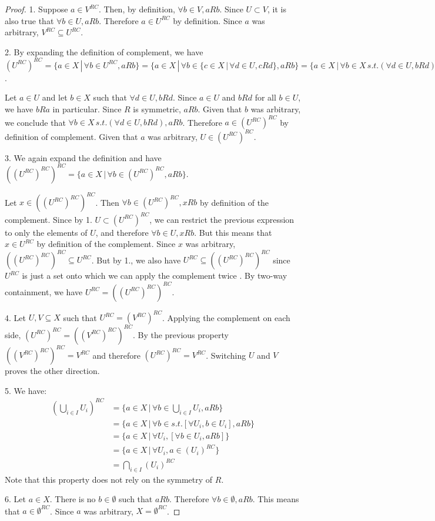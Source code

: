 \begin{proof}
	1. Suppose $a \in V^{RC}$. Then, by definition, $\forall b \in V, aRb$. Since $U \subset V$, it is also true that $\forall b \in U, aRb$. Therefore $a \in U^{RC}$ by definition. Since $a$ was arbitrary, $V^{RC} \subseteq U^{RC}$.
	
	2. By expanding the definition of complement, we have $(U^{RC})^{RC}=\{ a \in X \, | \, \forall b \in U^{RC}, aRb \} = \{ a \in X \, | \, \forall b \in \{ c \in X \, | \, \forall d \in U, cRd  \}, aRb \} = \{ a \in X \, | \, \forall b \in X \, s.t. (\forall d \in U, bRd), aRb \}$.
	
	Let $a \in U$ and let $b \in X$ such that $\forall d \in U, bRd$. Since $a \in U$ and $bRd$ for all $b \in U$, we have $bRa$ in particular. Since $R$ is symmetric, $aRb$. Given that $b$ was arbitrary, we conclude that $\forall b \in X \, s.t. (\forall d \in U, bRd), aRb$. Therefore $a \in (U^{RC})^{RC}$ by definition of complement. Given that $a$ was arbitrary, $U \in (U^{RC})^{RC}$.
	
	3. We again expand the definition and have $((U^{RC})^{RC})^{RC} = \{ a \in X \, | \, \forall b \in (U^{RC})^{RC}, aRb \}$.
	
	Let $x \in ((U^{RC})^{RC})^{RC}$. Then $\forall b \in (U^{RC})^{RC}, xRb$ by definition of the complement. Since by 1. $U \subset (U^{RC})^{RC}$, we can restrict the previous expression to only the elements of $U$, and therefore $\forall b \in U, xRb$. But this means that $x \in U^{RC}$ by definition of the complement. Since $x$ was arbitrary, $((U^{RC})^{RC})^{RC} \subseteq U^{RC}$. But by 1., we also have $U^{RC} \subseteq ((U^{RC})^{RC})^{RC}$ since $U^{RC}$ is just a set onto which we can apply the complement twice . By two-way containment, we have $U^{RC} = ((U^{RC})^{RC})^{RC}$.
	
	4. Let $U, V \subseteq X$ such that $U^{RC} = (V^{RC})^{RC}$. Applying the complement on each side, $(U^{RC})^{RC} = ((V^{RC})^{RC})^{RC}$. By the previous property $((V^{RC})^{RC})^{RC} = V^{RC}$ and therefore $(U^{RC})^{RC} = V^{RC}$. Switching $U$ and $V$ proves the other direction.
	
	5. We have:
	\begin{equation*}
		\begin{aligned}
			(\bigcup_{i \in I} U_i )^{RC} &= \{ a \in X \, | \, \forall b \in \bigcup_{i \in I} U_i, aRb \} \\
			&= \{ a \in X \, | \, \forall b \in s.t. [\forall U_i,  b \in U_i], aRb \} \\
			&= \{ a \in X \, | \, \forall U_i, [ \forall  b \in U_i, aRb ] \} \\
			&= \{ a \in X \, | \, \forall U_i, a \in (U_i)^{RC} \} \\
			&= \bigcap_{i \in I} (U_i)^{RC}
		\end{aligned}
	\end{equation*}
	Note that this property does not rely on the symmetry of $R$.
	
	6. Let $a \in X$. There is no $b \in \emptyset$ such that $aRb$. Therefore $\forall b \in \emptyset, aRb$. This means that $a \in \emptyset^{RC}$. Since $a$ was arbitrary, $X = \emptyset^{RC}$.
\end{proof}

